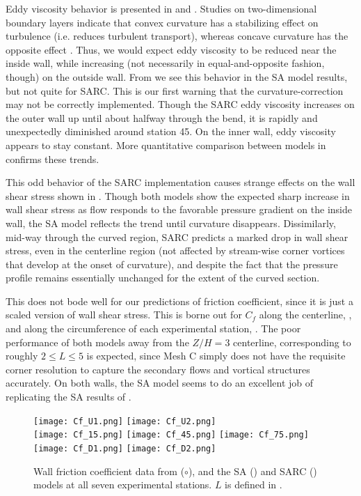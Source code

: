 \documentclass[11pt]{article}
\begin{document}
Eddy viscosity behavior is presented in  and . Studies on two-dimensional boundary layers indicate that convex curvature has a stabilizing effect on turbulence (i.e. reduces turbulent transport), whereas concave curvature has the opposite effect \citep{kim1994}. Thus, we would expect eddy viscosity to be reduced near the inside wall, while increasing (not necessarily in equal-and-opposite fashion, though) on the outside wall. From  we see this behavior in the SA model results, but not quite for SARC. This is our first warning that the curvature-correction may not be correctly implemented. Though the SARC eddy viscosity increases on the outer wall up until about halfway through the bend, it is rapidly and unexpectedly diminished around station 45. On the inner wall, eddy viscosity appears to stay constant. More quantitative comparison between models in  confirms these trends.

This odd behavior of the SARC implementation causes strange effects on the wall shear stress shown in . Though both models show the expected sharp increase in wall shear stress as flow responds to the favorable pressure gradient on the inside wall, the SA model reflects the trend until curvature disappears. Dissimilarly, mid-way through the curved region, SARC predicts a marked drop in wall shear stress, even in the centerline region (not affected by stream-wise corner vortices that develop at the onset of curvature), and despite the fact that the pressure profile remains essentially unchanged for the extent of the curved section.

This does not bode well for our predictions of friction coefficient, since it is just a scaled version of wall shear stress. This is borne out for $C_f$ along the centerline, , and along the circumference of each experimental station, . The poor performance of both models away from the $Z/H=3$ centerline, corresponding to roughly $2 \le L \le 5$ is expected, since Mesh C simply does not have the requisite corner resolution to capture the secondary flows and vortical structures accurately. On both walls, the SA model seems to do an excellent job of replicating the SA results of \citet{shur2000}.

\begin{figure}[p]
\centering
\texttt{[image: Cf\_U1.png]}
\texttt{[image: Cf\_U2.png]}\\
\texttt{[image: Cf\_15.png]}
\texttt{[image: Cf\_45.png]}
\texttt{[image: Cf\_75.png]}\\
\texttt{[image: Cf\_D1.png]}
\texttt{[image: Cf\_D2.png]}
\caption{Wall friction coefficient data from \citet{kim1994} ($\circ$), and the SA ({\color{blue}\solidrule[6mm]}) and SARC ({\color{red}\dashrule}) models at all seven experimental stations. $L$ is defined in .}
\label{fig:Cf_slices}
\end{figure}
\end{document}
